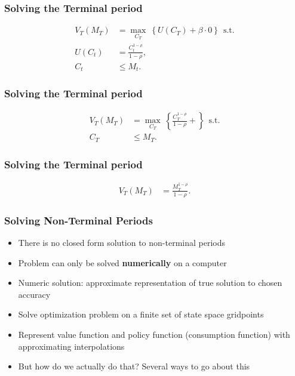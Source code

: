 \documentclass[aspectratio=169]{beamer}
\begin{document}
\begin{frame}
\frametitle{Solving the Terminal period}

\begin{align*}
V_T(M_T) &= \max_{C_T} ~ \left\{ U(C_T) + \beta \cdot 0 \right\} ~~\text{s.t.} \\
U(C_t) &= \frac{C_t^{1-\rho}}{1-\rho}, \\
C_t &\leq M_t.
\end{align*}
\end{frame}


\begin{frame}
\frametitle{Solving the Terminal period}

\begin{align*}
V_T(M_T) &= \max_{C_T} ~ \left\{ \frac{C_T^{1-\rho}}{1-\rho} +  \right\} ~~\text{s.t.} \\
C_T &\leq M_T.
\end{align*}
\end{frame}


\begin{frame}
\frametitle{Solving the Terminal period}

\begin{align*}
V_T(M_T) &= \frac{M_T^{1-\rho}}{1-\rho}.
\end{align*}
\end{frame}



\begin{frame}
\frametitle{Solving Non-Terminal Periods}

\begin{itemize}
	\item There is no closed form solution to non-terminal periods
	
	\item Problem can only be solved \textbf{numerically} on a computer
	
	\item Numeric solution: approximate representation of true solution to chosen accuracy
	
	\item Solve optimization problem on a finite set of state space gridpoints
	
	\item Represent value function and policy function (consumption function) with approximating interpolations
	
	\item But how do we actually do that? Several ways to go about this
\end{itemize}
\end{frame}
\end{document}
